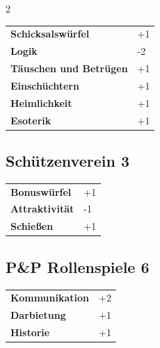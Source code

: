 \begin{multicols}{2}
\begin{tcolorbox}
\begin{tabular}{@{}ll@{}}
    \textbf{Schicksalswürfel} & +1\\
    \textbf{Logik} & -2\\
    \textbf{Täuschen und Betrügen} & +1\\
    \textbf{Einschüchtern} & +1\\
    \textbf{Heimlichkeit} & +1\\
    \textbf{Esoterik} & +1\\
\end{tabular}


\end{tcolorbox}

\begin{tcolorbox}
    \subsection*{Schützenverein \hfill \small{3 }}
    \tcblower




\begin{tabular}{@{}ll@{}}
    \textbf{Bonuswürfel} & +1\\
    \textbf{Attraktivität} & -1\\
    \textbf{Schießen} & +1\\
\end{tabular}


\end{tcolorbox}

\begin{tcolorbox}
    \subsection*{P\&P Rollenspiele \hfill \small{6 }}
    \tcblower




\begin{tabular}{@{}ll@{}}
    \textbf{Kommunikation} & +2\\
    \textbf{Darbietung} & +1\\
    \textbf{Historie} & +1\\
\end{tabular}


\end{tcolorbox}
\end{multicols}
